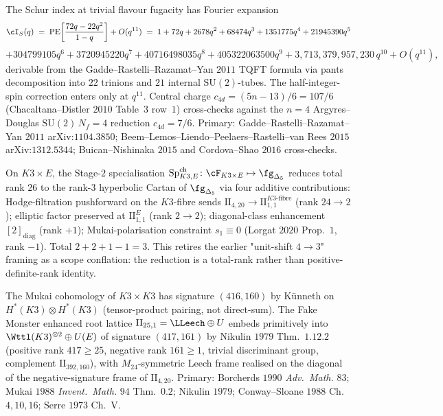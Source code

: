 \begin{theorem}
\label{wn:thm:wave3-schur-index-24}\ClaimStatusTheorem
The Schur index at trivial flavour fugacity has Fourier expansion
\[
\cI_S(q) \;=\; \mathrm{PE}\!\left[\frac{72 q - 22 q^2}{1 - q}\right]
+ O(q^{11})
\;=\; 1 + 72 q + 2678 q^2 + 68474 q^3 + 1351775 q^4 + 21945390 q^5
\]
\[
+ 304799105 q^6 + 3720945220 q^7 + 40716498035 q^8 + 405322063500 q^9
+ 3{,}713{,}379{,}957{,}230\, q^{10} + O(q^{11}),
\]
derivable from the Gadde--Rastelli--Razamat--Yan $2011$
TQFT formula via pants decomposition into $22$ trinions and
$21$ internal $\mathrm{SU}(2)$-tubes. The half-integer-spin correction
enters only at $q^{11}$. Central charge $c_{4d} = (5n - 13)/6 = 107/6$
(Chacaltana--Distler $2010$ Table~$3$ row~$1$) cross-checks against the
$n = 4$ Argyres--Douglas $\mathrm{SU}(2)\,N_f = 4$ reduction
$c_{4d} = 7/6$. Primary: Gadde--Rastelli--Razamat--Yan $2011$
arXiv:$1104.3850$; Beem--Lemos--Liendo--Peelaers--Rastelli--van Rees
$2015$ arXiv:$1312.5344$; Buican--Nishinaka $2015$ and
Cordova--Shao $2016$ cross-checks.
\end{theorem}

\begin{theorem}
\label{wn:thm:wave3-stage2-rank-reduction}\ClaimStatusTheorem
On $K3 \times E$, the Stage-$2$ specialisation
$\mathrm{Sp}^{\mathrm{ch}}_{K3, E}\colon \cF_{K3 \times E} \mapsto
\fg_{\Delta_5}$ reduces total rank $26$ to the rank-$3$ hyperbolic
Cartan of $\fg_{\Delta_5}$ via four additive contributions:
Hodge-filtration pushforward on the $K3$-fibre sends
$\mathrm{II}_{4, 20} \to \mathrm{II}^{K3\text{-}\mathrm{fibre}}_{1,1}$
(rank $24 \to 2$); elliptic factor preserved at
$\mathrm{II}^{E}_{1, 1}$ (rank $2 \to 2$); diagonal-class enhancement
$[2]_{\mathrm{diag}}$ (rank $+1$); Mukai-polarisation constraint
$s_1 \equiv 0$ (Lorgat $2020$ Prop.~$1$, rank $-1$). Total
$2 + 2 + 1 - 1 = 3$. This retires the earlier "unit-shift $4 \to 3$"
framing as a scope conflation: the reduction is a total-rank rather
than positive-definite-rank identity.
\end{theorem}

\begin{theorem}
\label{wn:thm:wave3-leech-embedding-K3K3}\ClaimStatusTheorem
The Mukai cohomology of $K3 \times K3$ has signature $(416, 160)$ by
K\"unneth on $H^*(K3) \otimes H^*(K3)$ (tensor-product pairing, not
direct-sum). The Fake Monster enhanced root lattice $\mathrm{II}_{25, 1}
= \LLeech \oplus U$ embeds primitively into
$\Wttl(K3)^{\otimes 2}\oplus U(E)$ of signature $(417, 161)$ by
Nikulin $1979$ Thm.~$1.12.2$ (positive rank $417 \geq 25$, negative
rank $161 \geq 1$, trivial discriminant group, complement
$\mathrm{II}_{392, 160}$), with $M_{24}$-symmetric Leech frame realised
on the diagonal of the negative-signature frame of $\mathrm{II}_{4, 20}$.
Primary: Borcherds $1990$ \emph{Adv.~Math.} $83$; Mukai $1988$
\emph{Invent.~Math.} $94$ Thm.~$0.2$; Nikulin $1979$; Conway--Sloane
$1988$ Ch.~$4,10,16$; Serre $1973$ Ch.~V.
\end{theorem}

